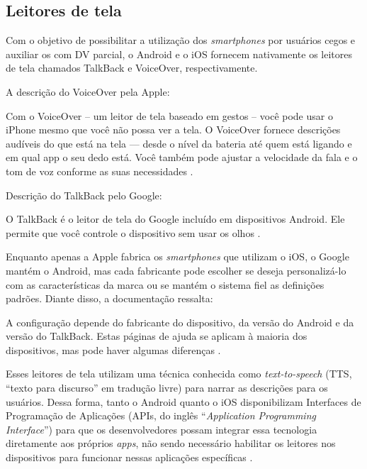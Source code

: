 \subsection{Leitores de tela}

Com o objetivo de possibilitar a utilização dos \emph{smartphones} por usuários cegos e auxiliar os com DV parcial, o Android e o iOS
fornecem nativamente os leitores de tela chamados TalkBack e VoiceOver, respectivamente.

A descrição do VoiceOver pela Apple:

\begin{citacao}
    Com o VoiceOver – um leitor de tela baseado em gestos – você pode usar o iPhone mesmo que você não possa ver a tela.
    O VoiceOver fornece descrições audíveis do que está na tela — desde o nível da bateria até quem está ligando e em qual
    app o seu dedo está. Você também pode ajustar a velocidade da fala e o tom de voz conforme as suas necessidades \cite{VoiceOver2021}.
\end{citacao}

Descrição do TalkBack pelo Google:

\begin{citacao}
    O TalkBack é o leitor de tela do Google incluído em dispositivos Android.
    Ele permite que você controle o dispositivo sem usar os olhos \cite{TalkBak2021}.
\end{citacao}

Enquanto apenas a Apple fabrica os \emph{smartphones} que utilizam o iOS, o Google mantém o Android, mas cada fabricante
pode escolher se deseja personalizá-lo com as características da marca ou se mantém o sistema fiel as definições padrões. Diante disso,
a documentação ressalta:

\begin{citacao}
    A configuração depende do fabricante do dispositivo, da versão do Android e da versão do TalkBack.
    Estas páginas de ajuda se aplicam à maioria dos dispositivos, mas pode haver algumas diferenças \cite{TalkBak2021}.
\end{citacao}

Esses leitores de tela utilizam uma técnica conhecida como \emph{text-to-speech} (TTS, ``texto para discurso'' em tradução livre)
para narrar as descrições para os usuários. Dessa forma, tanto o Android quanto o iOS disponibilizam Interfaces de Programação de Aplicações
(APIs, do inglês ``\emph{Application Programming Interface}'') para que os desenvolvedores possam integrar essa tecnologia diretamente aos
próprios \emph{apps}, não sendo necessário habilitar os leitores nos dispositivos para funcionar nessas aplicações específicas
\cite{Heesook2017,Biase2018,Oliveira2019,Caballero2020}.

